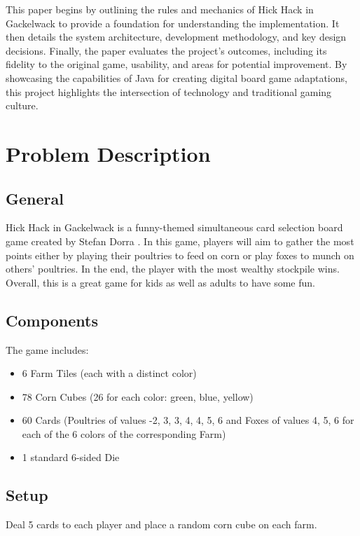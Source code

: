 \documentclass[conference]{IEEEtran}
\begin{document}
This paper begins by outlining the rules and mechanics of Hick Hack in Gackelwack to provide a foundation for understanding the implementation. It then details the system architecture, development methodology, and key design decisions. Finally, the paper evaluates the project's outcomes, including its fidelity to the original game, usability, and areas for potential improvement. By showcasing the capabilities of Java for creating digital board game adaptations, this project highlights the intersection of technology and traditional gaming culture.

\section{Problem Description}

\subsection{General}

Hick Hack in Gackelwack is a funny-themed simultaneous card selection board game created by Stefan Dorra \cite{b1}. In this game, players will aim to gather the most points either by playing their poultries to feed on corn or play foxes to munch on others' poultries. In the end, the player with the most wealthy stockpile wins. Overall, this is a great game for kids as well as adults to have some fun.

\subsection{Components}

The game includes:

\begin{itemize}
    \item 6 Farm Tiles (each with a distinct color)
    \item 78 Corn Cubes (26 for each color: green, blue, yellow)
    \item 60 Cards (Poultries of values -2, 3, 3, 4, 4, 5, 6 and Foxes of values 4, 5, 6 for each of the 6 colors of the corresponding Farm)
    \item 1 standard 6-sided Die
\end{itemize}

\subsection{Setup}

Deal 5 cards to each player and place a random corn cube on each farm.
\end{document}

